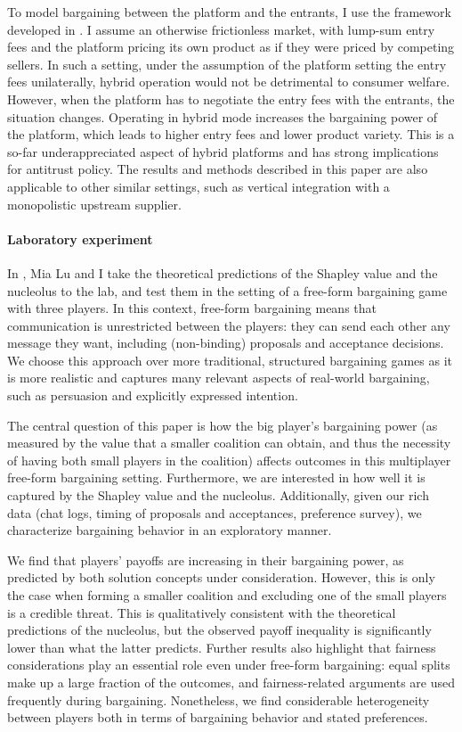 To model bargaining between the platform and the entrants, I use the framework developed in .
I assume an otherwise frictionless market, with lump-sum entry fees and the platform pricing its own product as if they were priced by competing sellers.
In such a setting, under the assumption of the platform setting the entry fees unilaterally, hybrid operation would not be detrimental to consumer welfare.
However, when the platform has to negotiate the entry fees with the entrants, the situation changes.
Operating in hybrid mode increases the bargaining power of the platform, which leads to higher entry fees and lower product variety.
This is a so-far underappreciated aspect of hybrid platforms and has strong implications for antitrust policy.
The results and methods described in this paper are also applicable to other similar settings, such as vertical integration with a monopolistic upstream supplier.

\paragraph{Laboratory experiment}
In , Mia Lu and I take the theoretical predictions of the Shapley value and the nucleolus to the lab, and test them in the setting of a free-form bargaining game with three players.
In this context, free-form bargaining means that communication is unrestricted between the players: they can send each other any message they want, including (non-binding) proposals and acceptance decisions.
We choose this approach over more traditional, structured bargaining games as it is more realistic and captures many relevant aspects of real-world bargaining, such as persuasion and explicitly expressed intention.

The central question of this paper is how the big player's bargaining power (as measured by the value that a smaller coalition can obtain, and thus the necessity of having both small players in the coalition) affects outcomes in this multiplayer free-form bargaining setting.
Furthermore, we are interested in how well it is captured by the Shapley value and the nucleolus.
Additionally, given our rich data (chat logs, timing of proposals and acceptances, preference survey), we characterize bargaining behavior in an exploratory manner.

We find that players' payoffs are increasing in their bargaining power, as predicted by both solution concepts under consideration.
However, this is only the case when forming a smaller coalition and excluding one of the small players is a credible threat.
This is qualitatively consistent with the theoretical predictions of the nucleolus, but the observed payoff inequality is significantly lower than what the latter predicts.
Further results also highlight that fairness considerations play an essential role even under free-form bargaining: equal splits make up a large fraction of the outcomes, and fairness-related arguments are used frequently during bargaining.
Nonetheless, we find considerable heterogeneity between players both in terms of bargaining behavior and stated preferences.
